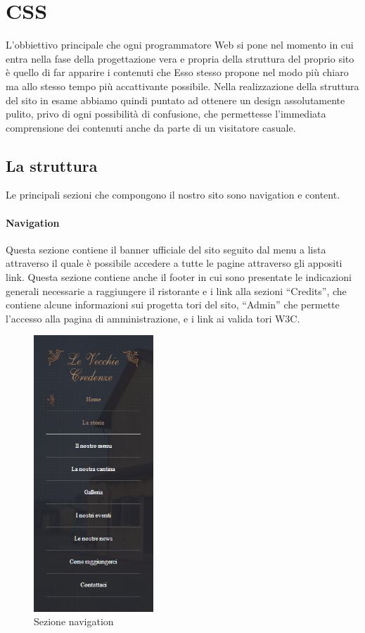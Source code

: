\section{CSS}

L’obbiettivo principale che ogni programmatore Web si pone nel momento in cui entra nella fase della progettazione vera e propria della struttura del proprio sito è quello di far apparire i contenuti che Esso stesso propone nel modo più chiaro ma allo stesso tempo più accattivante possibile. Nella realizzazione della struttura del sito in esame abbiamo quindi puntato ad ottenere un design assolutamente pulito, privo di ogni possibilità di confusione, che permettesse l’immediata comprensione dei contenuti anche da parte di un visitatore casuale. 

\subsection{La struttura}
Le principali sezioni che compongono il nostro sito sono  navigation e content.

\paragraph{Navigation}

Questa sezione contiene il banner ufficiale del sito seguito dal menu a lista attraverso il quale è possibile accedere a tutte le pagine attraverso gli appositi link. Questa sezione contiene anche il footer in cui sono presentate le indicazioni generali necessarie a raggiungere il ristorante e i link alla sezioni “Credits”, che contiene alcune informazioni sui progetta tori del sito, “Admin” che permette l’accesso alla pagina di amministrazione, e i link ai valida tori W3C.


\begin{figure}[H]
		\centering \includegraphics[width=0.4\textwidth]{images/navigation.png}
		\caption{Sezione navigation}
\end{figure}

